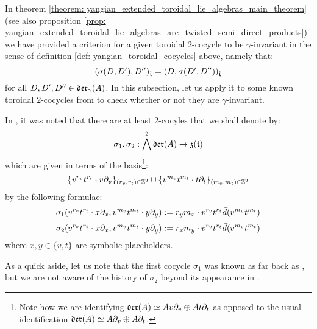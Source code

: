         In theorem \ref{theorem: yangian_extended_toroidal_lie_algebras_main_theorem} (see also proposition \ref{prop: yangian_extended_toroidal_lie_algebras_are_twisted_semi_direct_products}) we have provided a criterion for a given toroidal $2$-cocycle to be $\gamma$-invariant in the sense of definition \ref{def: yangian_toroidal_cocycles} above, namely that:
            $$( \sigma(D, D'), D'' )_{\hat{\mathfrak{t}}} = ( D, \sigma(D', D'') )_{\hat{\mathfrak{t}}}$$
        for all $D, D', D'' \in \mathfrak{der}_{\gamma}(A)$. In this subsection, let us apply it to some known toroidal $2$-cocycles from \cite{billig_energy_momentum_tensor} to check whether or not they are $\gamma$-invariant. 
        \begin{example} \label{example: billig_toroidal_cocycles}
            In \cite[p. 5, below Equation 1.3]{billig_energy_momentum_tensor}, it was noted that there are at least $2$-cocyles that we shall denote by:
                $$\sigma_1, \sigma_2: \bigwedge^2 \mathfrak{der}(A) \to \mathfrak{z}(\mathfrak{t})$$
            which are given in terms of the basis\footnote{Note how we are identifying $\mathfrak{der}(A) \simeq A v\partial_v \oplus A t\partial_t$ as opposed to the usual identification $\mathfrak{der}(A) \simeq A \partial_v \oplus A \partial_t$.}:
                $$\{ v^{r_v} t^{r_t} \cdot v \partial_v \}_{(r_v, r_t) \in \mathbb{Z}^2} \cup \{ v^{m_v} t^{m_t} \cdot t \partial_t \}_{(m_v, m_t) \in \mathbb{Z}^2}$$
            by the following formulae:
                $$\sigma_1( v^{r_v} t^{r_t} \cdot x \partial_x, v^{m_v} t^{m_t} \cdot y \partial_y ) := r_y m_x \cdot v^{r_v} t^{r_t} \bar{d}( v^{m_v} t^{m_t} )$$
                $$\sigma_2( v^{r_v} t^{r_t} \cdot x \partial_x, v^{m_v} t^{m_t} \cdot y \partial_y ) := r_x m_y \cdot v^{r_v} t^{r_t} \bar{d}( v^{m_v} t^{m_t} )$$
            where $x, y \in \{v, t\}$ are symbolic placeholders.
            
            As a quick aside, let us note that the first cocycle $\sigma_1$ was known as far back as \cite{moody_rao_yokonuma_vertex_representations_of_toroidal_lie_algebras}, but we are not aware of the history of $\sigma_2$ beyond its appearance in \cite{billig_energy_momentum_tensor}.
        \end{example}

